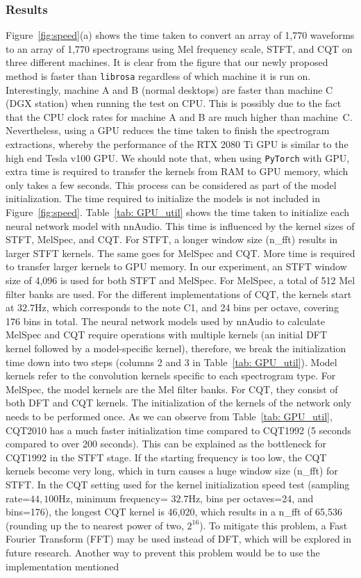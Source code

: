 \documentclass{ieeeaccess}
\newcommand{\nbh}[1]{\texttt{#1}}
\begin{document}
\subsubsection{Results}
Figure~\ref{fig:speed}(a) shows the time taken to convert an array of 1,770 waveforms to an array of 1,770 spectrograms using Mel frequency scale, STFT, and CQT on three different machines. It is clear from the figure that our newly proposed method is faster than \nbh{librosa} {regardless of which machine it is run on. Interestingly, machine A and B (normal desktops) are faster than machine C (DGX station) when running the test on CPU. This is possibly due to the fact that the CPU clock rates for machine A and B are much higher than machine~C. Nevertheless, using a GPU reduces the time taken to finish the spectrogram extractions, whereby the performance of the RTX 2080 Ti GPU is similar to the high end Tesla v100 GPU.} We should note that, when using \nbh{PyTorch} with GPU, extra time is required to transfer the kernels from RAM to GPU memory, which only takes a few seconds. This process can be considered as part of the model initialization. The time required to initialize the models is not included in Figure~\ref{fig:speed}. Table~\ref{tab: GPU_util} shows the time taken to initialize each neural network model with nnAudio. This time is influenced by the kernel sizes of STFT, MelSpec, and CQT. For STFT, a longer window size (n\_fft) results in larger STFT kernels. The same goes for MelSpec and CQT. More time is required to transfer larger kernels to GPU memory. In our experiment, an STFT window size of 4,096 is used for both STFT and MelSpec. For MelSpec, a total of 512 Mel filter banks are used. For the different implementations of CQT, the kernels start at $32.7$Hz, which corresponds to the note C1, and 24 bins per octave, covering 176 bins in total. The neural network models used by nnAudio to calculate MelSpec and CQT require operations with multiple kernels (an initial DFT kernel followed by a model-specific kernel), therefore, we break the initialization time down into two steps (columns 2 and 3 in Table~\ref{tab: GPU_util}). Model kernels refer to the convolution kernels specific to each spectrogram type. For MelSpec, the model kernels are the Mel filter banks. For CQT, they consist of both DFT and CQT kernels. The initialization of the kernels of the network only needs to be performed once. As we can observe from Table~\ref{tab: GPU_util}, CQT2010 has a much faster initialization time compared to CQT1992 (5 seconds compared to over 200 seconds). This can be explained as the bottleneck for CQT1992 in the STFT stage. If the starting frequency is too low, the CQT kernels become very long, which in turn causes a huge window size (n\_fft) for STFT. In the CQT setting used for the kernel initialization speed test (sampling rate=$44,100$Hz, minimum frequency= $32.7$Hz, bins per octaves=24, and bins=176), the longest CQT kernel is 46,020, which results in a n\_fft of 65,536 (rounding up the to nearest power of two, $2^{16}$). To mitigate this problem, a Fast Fourier Transform (FFT) may be used instead of DFT, which will be explored in future research. Another way to prevent this problem would be to use the implementation mentioned 
\end{document}

